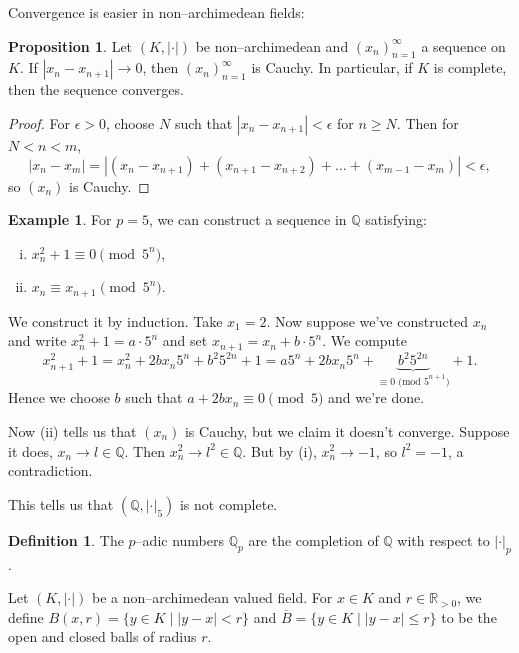 \documentclass{article}
\theoremstyle{definition}
\newtheorem{prop}[theorem]{Proposition}
\newtheorem{example}{Example}[section]
\newtheorem{defn}{Definition}[section]
\begin{document}
Convergence is easier in non--archimedean fields:
\begin{prop}
    Let $(K,|\cdot|)$ be non--archimedean and $(x_n)_{n=1}^{\infty}$ a sequence on $K$. If $|x_n-x_{n+1}| \to 0$, then $(x_n)_{n=1}^{\infty}$ is Cauchy. In particular, if $K$ is complete, then the sequence converges.
\end{prop}
\begin{proof}
    For $\epsilon > 0 $, choose $N$ such that $|x_n-x_{n+1}| < \epsilon$ for $n \ge N$. Then for $N<n<m$, \[
    |x_n - x_m| = |(x_n - x_{n+1}) + (x_{n+1} - x_{n+2}) + \ldots + (x_{m-1}-x_m)| < \epsilon,
    \]
    so $(x_n)$ is Cauchy.
\end{proof}
\begin{example}
    For $p=5$, we can construct a sequence in $\mathbb{Q}$ satisfying:
    \begin{enumerate}[(i)]
        \item $x_n^2+1 \equiv  0 \pmod{5^n}$,
        \item $x_n \equiv x_{n+1} \pmod{5^n}$.
    \end{enumerate}
    We construct it by induction. Take $x_1=2$. Now suppose we've constructed $x_n$ and write $x_n^2+1 = a\cdot 5^n$ and set $x_{n+1} = x_n + b\cdot 5^n$. We compute \[
    x_{n+1}^2 + 1 = x_n^2 + 2b x_n 5^n + b^2 5^{2n} + 1 = a5^n + 2bx_n 5^n + \underbrace{b^2 5^{2n}}_{\equiv 0 \text{ (mod }5^{n+1})} + 1. 
    \]
    Hence we choose $b$ such that $a+2bx_n \equiv 0 \pmod{5}$ and we're done. 
    \vspace{1mm}
     
    Now (ii) tells us that $(x_n)$ is Cauchy, but we claim it doesn't converge. Suppose it does, $x_n \to l \in \mathbb{Q}$. Then $x_n^2 \to l^2 \in \mathbb{Q}$. But by (i), $x_n^2 \to -1$, so $l^2 = -1$, a contradiction.
\end{example}
This tells us that $(\mathbb{Q}, |\cdot|_{5})$ is not complete.
\begin{defn}
    The $p$--adic numbers $\mathbb{Q}_p$ are the completion of $\mathbb{Q}$ with respect to $|\cdot|_p$.
\end{defn}


Let $(K,|\cdot|)$ be a non--archimedean valued field. For $x \in K$ and $r \in \mathbb{R}_{>0}$, we define $B(x,r) = \{y \in K \mid |y-x|<r\}$ and $\overline{B} = \{y \in K \mid |y-x|\le r\}$ to be the open and closed balls of radius $r$.
\end{document}
